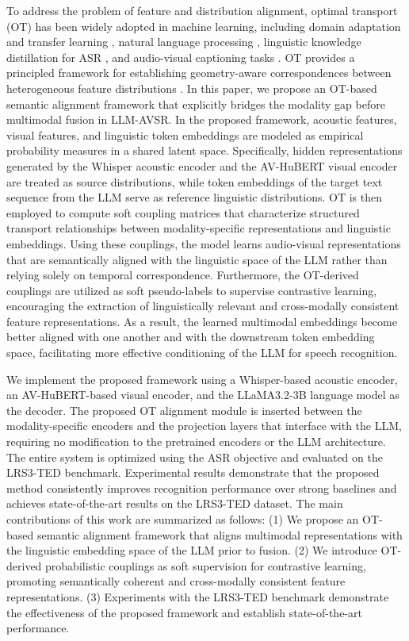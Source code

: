 \documentclass[conference]{IEEEtran}
\begin{document}
To address the problem of feature and distribution alignment, optimal transport (OT) has been widely adopted in machine learning, including domain adaptation and transfer learning \cite{Courty2014}, natural language processing \cite{KusnerICML2015, Yokoi2020}, linguistic knowledge distillation for ASR \cite{LuASRU2023, LuICASSP2024}, and audio-visual captioning tasks \cite{LAVCAP2025}. OT provides a principled framework for establishing geometry-aware correspondences between heterogeneous feature distributions \cite{PeyreBook2019}. In this paper, we propose an OT-based semantic alignment framework that explicitly bridges the modality gap before multimodal fusion in LLM-AVSR. In the proposed framework, acoustic features, visual features, and linguistic token embeddings are modeled as empirical probability measures in a shared latent space. Specifically, hidden representations generated by the Whisper acoustic encoder and the AV-HuBERT visual encoder are treated as source distributions, while token embeddings of the target text sequence from the LLM serve as reference linguistic distributions. OT is then employed to compute soft coupling matrices that characterize structured transport relationships between modality-specific representations and linguistic embeddings. Using these couplings, the model learns audio-visual representations that are semantically aligned with the linguistic space of the LLM rather than relying solely on temporal correspondence. Furthermore, the OT-derived couplings are utilized as soft pseudo-labels to supervise contrastive learning, encouraging the extraction of linguistically relevant and cross-modally consistent feature representations. As a result, the learned multimodal embeddings become better aligned with one another and with the downstream token embedding space, facilitating more effective conditioning of the LLM for speech recognition.

We implement the proposed framework using a Whisper-based acoustic encoder, an AV-HuBERT-based visual encoder, and the LLaMA3.2-3B language model as the decoder. The proposed OT alignment module is inserted between the modality-specific encoders and the projection layers that interface with the LLM, requiring no modification to the pretrained encoders or the LLM architecture. The entire system is optimized using the ASR objective and evaluated on the LRS3-TED benchmark. Experimental results demonstrate that the proposed method consistently improves recognition performance over strong baselines and achieves state-of-the-art results on the LRS3-TED dataset. The main contributions of this work are summarized as follows: (1) We propose an OT-based semantic alignment framework that aligns multimodal representations with the linguistic embedding space of the LLM prior to fusion. (2) We introduce OT-derived probabilistic couplings as soft supervision for contrastive learning, promoting semantically coherent and cross-modally consistent feature representations. (3) Experiments with the LRS3-TED benchmark demonstrate the effectiveness of the proposed framework and establish state-of-the-art performance.
\end{document}

